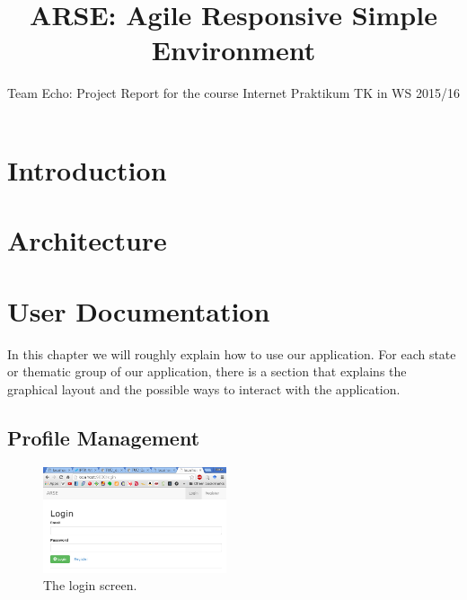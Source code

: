 \documentclass[
	accentcolor=tud1a %
]{tudreport}
\begin{document}
\title{ARSE: Agile Responsive Simple Environment}
\subtitle{Team Echo: Project Report for the course Internet Praktikum TK in WS 2015/16}

\maketitle

\tableofcontents

\chapter{Introduction}
\label{ch:introduction}

\blindtext

\chapter{Architecture}
\label{ch:architecture}

\chapter{User Documentation}
\label{ch:use-documentation}

In this chapter we will roughly explain how to use our application. For each state or thematic group of our application, there is a section that explains the graphical layout and the possible ways to interact with the application.


\section{Profile Management}
\label{sec:profile-mgmt}

\begin{figure}
  	\centering
	\includegraphics[width=0.48\textwidth]{img/login}
	\caption{The login screen.}
	\label{fig:login}
\end{figure}
\end{document}
